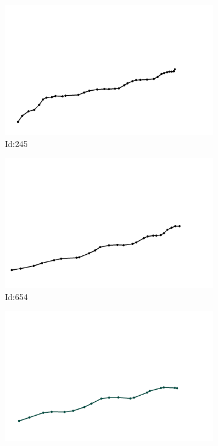 \documentclass[12pt,twoside]{report}
\begin{document}
\begin{figure}
\centering
\begin{subfigure}[b]{0.20\textwidth}
\centering
\includegraphics[width=\textwidth]{../../trajectories/245.png}
\caption{Id:245}
\end{subfigure}
\begin{subfigure}[b]{0.20\textwidth}
\centering
\includegraphics[width=\textwidth]{../../trajectories/654.png}
\caption{Id:654}
\end{subfigure}
\begin{subfigure}[b]{0.20\textwidth}
\centering
\includegraphics[width=\textwidth]{../../trajectories/671.png}

\end{subfigure}
\end{figure}
\end{document}
